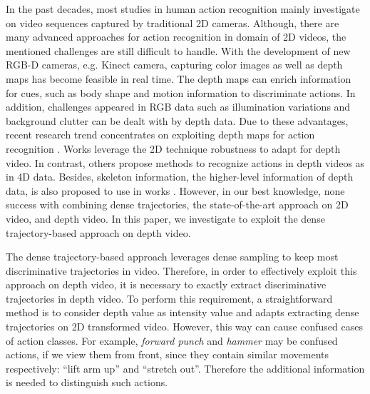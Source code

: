 In the past decades, most studies in human action recognition mainly investigate on video sequences captured by traditional 2D cameras.
Although, there are many advanced approaches for action recognition in domain of 2D videos, the mentioned challenges are still difficult to handle.
With the development of new RGB-D cameras, e.g. Kinect camera, capturing color images as well as depth maps has become feasible in real time.
The depth maps can enrich information for cues, such as body shape and motion information to discriminate actions.
In addition, challenges appeared in RGB data such as illumination variations and background clutter can be dealt with by depth data.
Due to these advantages, recent research trend concentrates on exploiting depth maps for action recognition \cite{li2010action, wang2012mining, vieira2012stop, yang2012eigenjoints, yang2012recognizing, wang2012robust, xia2013spatio, oreifej2013hon4d}.
Works \cite{li2010action, yang2012recognizing, xia2013spatio} leverage the 2D technique robustness to adapt for depth video.
In contrast, others \cite{vieira2012stop, wang2012robust, oreifej2013hon4d} propose methods to recognize actions in depth videos as in 4D data.
Besides, skeleton information, the higher-level information of depth data, is also proposed to use in works \cite{wang2012mining, yang2012eigenjoints}.
However, in our best knowledge, none success with combining dense trajectories, the state-of-the-art approach on 2D video, and depth video.
In this paper, we investigate to exploit the dense trajectory-based approach on depth video.

The dense trajectory-based approach leverages dense sampling to keep most discriminative trajectories in video.
Therefore, in order to effectively exploit this approach on depth video, it is necessary to exactly extract discriminative trajectories in depth video.
To perform this requirement, a straightforward method is to consider depth value as intensity value and adapts extracting dense trajectories on 2D transformed video.
However, this way can cause confused cases of action classes.
For example, \textit{forward punch} and \textit{hammer} may be confused actions, if we view them from front, since they contain similar movements respectively: “lift arm up” and “stretch out”.
Therefore the additional information is needed to distinguish such actions.

